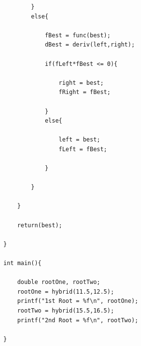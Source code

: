 \documentclass[12pt]{article}
\begin{document}
\begin{verbatim}
		}
		else{

			fBest = func(best);
			dBest = deriv(left,right);

			if(fLeft*fBest <= 0){

				right = best;
				fRight = fBest;

			}
			else{

				left = best;
				fLeft = fBest;

			}

		}

	}

	return(best);

}

int main(){

	double rootOne, rootTwo;
	rootOne = hybrid(11.5,12.5);
	printf("1st Root = %f\n", rootOne);
	rootTwo = hybrid(15.5,16.5);
	printf("2nd Root = %f\n", rootTwo);

}
\end{verbatim}
\end{document}
